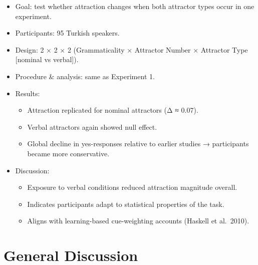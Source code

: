 \documentclass[
  authoryear,
  preprint]{elsarticle}
\providecommand{\tightlist}{%
  \setlength{\itemsep}{0pt}\setlength{\parskip}{0pt}}
\begin{document}
\begin{itemize}
\tightlist
\item
  Goal: test whether attraction changes when both attractor types occur
  in one experiment.
\item
  Participants: 95 Turkish speakers.
\item
  Design: 2 × 2 × 2 (Grammaticality × Attractor Number × Attractor Type
  {[}nominal vs verbal{]}).
\item
  Procedure \& analysis: same as Experiment 1.
\item
  Results:

  \begin{itemize}
  \tightlist
  \item
    Attraction replicated for nominal attractors (Δ ≈ 0.07).
  \item
    Verbal attractors again showed null effect.
  \item
    Global decline in yes-responses relative to earlier studies →
    participants became more conservative.
  \end{itemize}
\item
  Discussion:

  \begin{itemize}
  \tightlist
  \item
    Exposure to verbal conditions reduced attraction magnitude overall.
  \item
    Indicates participants adapt to statistical properties of the task.
  \item
    Aligns with learning-based cue-weighting accounts (Haskell et
    al.~2010).
  \end{itemize}
\end{itemize}

\section{General Discussion}\label{general-discussion}
\end{document}
